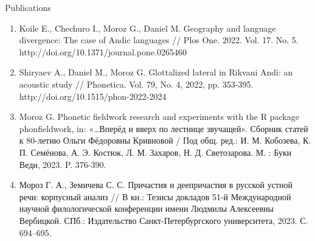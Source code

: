 \documentclass{resume} %
\begin{document}
\begin{rSection}{Publications}
\begin{enumerate}
\item Koile E., Chechuro I., Moroz G., Daniel M. Geography and language divergence: The case of Andic languages // Plos One. 2022. Vol. 17. No. 5. http://doi.org/10.1371/journal.pone.0265460
\item Shiryaev A., Daniel M., Moroz G. Glottalized lateral in Rikvani Andi: an acoustic study // Phonetica. Vol. 79, No. 4, 2022, pp. 353-395. http://doi.org/10.1515/phon-2022-2024
\item Moroz G. Phonetic fieldwork research and experiments with the R package phonfieldwork, in: «…Вперёд и вверх по лестнице звучащей». Сборник статей к 80-летию Ольги Фёдоровны Кривновой / Под общ. ред.: И. М. Кобозева, К. П. Семёнова, А. Э. Костюк, Л. М. Захаров, Н. Д. Светозарова. М. : Буки Веди, 2023. P. 376-390.
\item Мороз Г. А., Земичева С. С. Причастия и деепричастия в русской устной речи: корпусный анализ // В кн.: Тезисы докладов 51-й Международной научной филологической конференции имени Людмилы Алексеевны Вербицкой. СПб.: Издательство Санкт-Петербургского университета, 2023. С. 694--695.

\end{enumerate}
\end{rSection}
\end{document}

